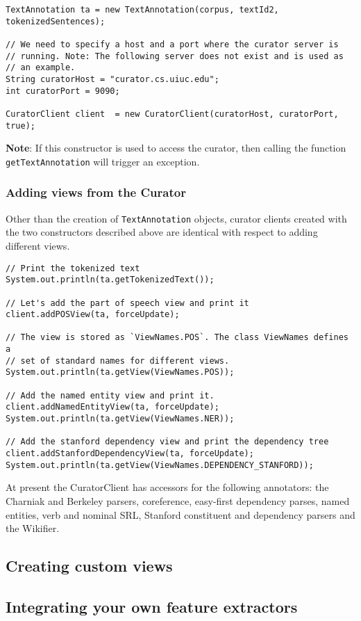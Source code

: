 \documentclass[11pt]{article}
\begin{document}
\begin{enumerate}
\begin{lstlisting}
TextAnnotation ta = new TextAnnotation(corpus, textId2, tokenizedSentences);

// We need to specify a host and a port where the curator server is
// running. Note: The following server does not exist and is used as
// an example. 
String curatorHost = "curator.cs.uiuc.edu";
int curatorPort = 9090;

CuratorClient client  = new CuratorClient(curatorHost, curatorPort, true);
\end{lstlisting}

      \textbf{Note}: If this constructor is used to access the curator, then
      calling the function \texttt{getTextAnnotation} will trigger an
      exception.
\end{enumerate}


   
\subsubsection{Adding views from the Curator}
\label{sec-6-2-1}

    Other than the creation of \texttt{TextAnnotation} objects, curator
    clients created with the two constructors described above are
    identical with respect to adding different views.

\lstset{frame=lines,basicstyle=\footnotesize,numbers=left,captionpos=b,showstringspaces=false,numberstyle=\tiny,language=java}
\begin{lstlisting}
// Print the tokenized text
System.out.println(ta.getTokenizedText());

// Let's add the part of speech view and print it
client.addPOSView(ta, forceUpdate);

// The view is stored as `ViewNames.POS`. The class ViewNames defines a
// set of standard names for different views.
System.out.println(ta.getView(ViewNames.POS));

// Add the named entity view and print it.
client.addNamedEntityView(ta, forceUpdate);
System.out.println(ta.getView(ViewNames.NER));

// Add the stanford dependency view and print the dependency tree
client.addStanfordDependencyView(ta, forceUpdate);
System.out.println(ta.getView(ViewNames.DEPENDENCY_STANFORD));
\end{lstlisting}

    At present the CuratorClient has accessors for the following
    annotators: the Charniak and Berkeley parsers, coreference,
    easy-first dependency parses, named entities, verb and nominal
    SRL, Stanford constituent and dependency parsers and the Wikifier.
\subsection{Creating custom views}
\label{sec-6-3}
\subsection{Integrating your own feature extractors}
\label{sec-6-4}
\end{document}
